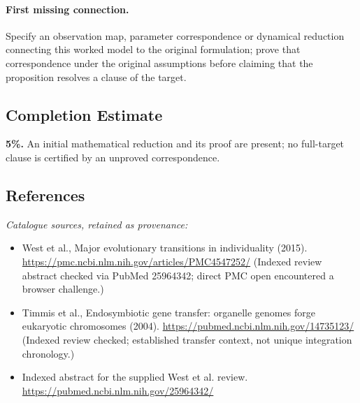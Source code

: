 \documentclass[11pt]{article}
\begin{document}
\paragraph{First missing connection.} Specify an observation map, parameter correspondence or dynamical reduction connecting this worked model to the original formulation; prove that correspondence under the original assumptions before claiming that the proposition resolves a clause of the target.
\subsection{Completion Estimate}
\textbf{5\%.} An initial mathematical reduction and its proof are present; no full-target clause is certified by an unproved correspondence.
\subsection{References}
\noindent\emph{Catalogue sources, retained as provenance:}
\begin{itemize}
\item West et al., Major evolutionary transitions in individuality (2015). \url{https://pmc.ncbi.nlm.nih.gov/articles/PMC4547252/} (Indexed review abstract checked via PubMed 25964342; direct PMC open encountered a browser challenge.)
\item Timmis et al., Endosymbiotic gene transfer: organelle genomes forge eukaryotic chromosomes (2004). \url{https://pubmed.ncbi.nlm.nih.gov/14735123/} (Indexed review checked; established transfer context, not unique integration chronology.)
\item Indexed abstract for the supplied West et al. review. \url{https://pubmed.ncbi.nlm.nih.gov/25964342/}
\end{itemize}
\end{document}

